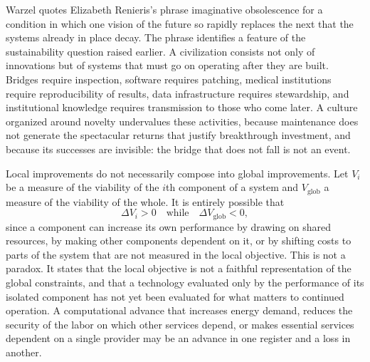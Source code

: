 \documentclass[11pt]{article}
\theoremstyle{plain}
\theoremstyle{definition}
\theoremstyle{remark}
\begin{document}
Warzel quotes Elizabeth Renieris's phrase imaginative obsolescence for a condition in which one vision of the future so rapidly replaces the next that the systems already in place decay. The phrase identifies a feature of the sustainability question raised earlier. A civilization consists not only of innovations but of systems that must go on operating after they are built. Bridges require inspection, software requires patching, medical institutions require reproducibility of results, data infrastructure requires stewardship, and institutional knowledge requires transmission to those who come later. A culture organized around novelty undervalues these activities, because maintenance does not generate the spectacular returns that justify breakthrough investment, and because its successes are invisible: the bridge that does not fall is not an event.

Local improvements do not necessarily compose into global improvements. Let $V_i$ be a measure of the viability of the $i$th component of a system and $V_{\mathrm{glob}}$ a measure of the viability of the whole. It is entirely possible that
\[
\Delta V_i > 0 \quad \text{while} \quad \Delta V_{\mathrm{glob}} < 0,
\]
since a component can increase its own performance by drawing on shared resources, by making other components dependent on it, or by shifting costs to parts of the system that are not measured in the local objective. This is not a paradox. It states that the local objective is not a faithful representation of the global constraints, and that a technology evaluated only by the performance of its isolated component has not yet been evaluated for what matters to continued operation. A computational advance that increases energy demand, reduces the security of the labor on which other services depend, or makes essential services dependent on a single provider may be an advance in one register and a loss in another.
\end{document}

